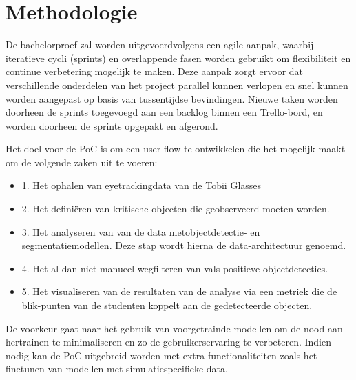 \section{Methodologie}%
\label{sec:methodologie}

De bachelorproef zal worden uitgevoerd\newline volgens een agile aanpak, waarbij iteratieve cycli (sprints) 
en overlappende fasen worden gebruikt om flexibiliteit en continue verbetering mogelijk te maken. 
Deze aanpak zorgt ervoor dat verschillende onderdelen van het project parallel kunnen verlopen en snel 
kunnen worden aangepast op basis van tussentijdse bevindingen. Nieuwe taken worden doorheen de sprints toegevoegd 
aan een backlog binnen een Trello-bord, en worden doorheen de sprints opgepakt en afgerond.
\par
Het doel voor de PoC is om een user-flow te ontwikkelen die het mogelijk maakt om de volgende zaken uit te voeren:
\begin{itemize}
    \item 1. Het ophalen van eyetrackingdata van de Tobii Glasses
    \item 2. Het definiëren van kritische objecten die geobserveerd moeten worden.
    \item 3. Het analyseren van van de data met\newline objectdetectie- en segmentatiemodellen.\newline
    Deze stap wordt hierna de data-architectuur genoemd.
    \item 4. Het al dan niet manueel wegfilteren van vals-positieve objectdetecties.
    \item 5. Het visualiseren van de resultaten van de analyse via een metriek die de blik-punten van de studenten koppelt aan de gedetecteerde objecten.
\end{itemize}
\par
De voorkeur gaat naar het gebruik van voorgetrainde modellen om de nood aan hertrainen te minimaliseren en zo de gebruikerservaring te verbeteren.
Indien nodig kan de PoC uitgebreid worden met extra functionaliteiten zoals het finetunen van modellen met simulatiespecifieke data.

